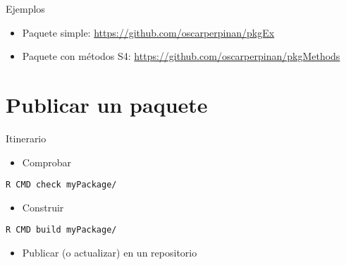 \documentclass[xcolor={usenames,svgnames,dvipsnames}]{beamer}
\begin{document}
\begin{frame}[label={sec:org8d027c0}]{Ejemplos}
\begin{itemize}
\item Paquete simple: \url{https://github.com/oscarperpinan/pkgEx}
\item Paquete con métodos S4: \url{https://github.com/oscarperpinan/pkgMethods}
\end{itemize}
\end{frame}

\section{Publicar un paquete}
\label{sec:orga2b0610}

\begin{frame}[fragile,label={sec:org6292448}]{Itinerario}
 \begin{itemize}
\item Comprobar
\end{itemize}
\begin{verbatim}
R CMD check myPackage/
\end{verbatim}
\begin{itemize}
\item Construir
\end{itemize}
\begin{verbatim}
R CMD build myPackage/
\end{verbatim}
\begin{itemize}
\item Publicar (o actualizar) en un repositorio
\end{itemize}
\end{frame}
\end{document}

